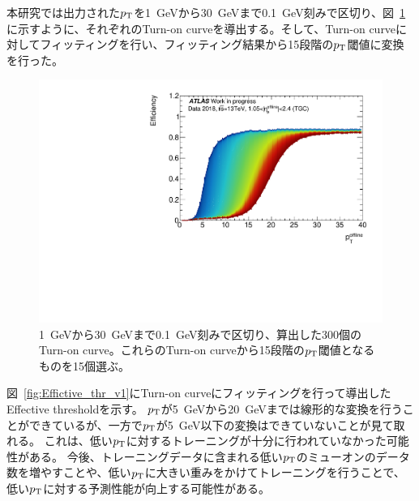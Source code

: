 本研究では出力された$p_{\rm{T}}$を1~GeVから30~GeVまで0.1~GeV刻みで区切り、図~\ref{fig:ALL_Turn-on}に示すように、それぞれのTurn-on curveを導出する。そして、Turn-on curveに対してフィッティングを行い、フィッティング結果から15段階の$p_{\rm{T}}$閾値に変換を行った。
\begin{figure}[htb]
  \centering
  \hspace*{-1cm}
  \includegraphics[clip, width=12cm]{fig/4/ALLthr_v06_Data.pdf}
  \caption{1~GeVから30~GeVまで0.1~GeV刻みで区切り、算出した300個のTurn-on curve。これらのTurn-on curveから15段階の$p_{\rm{T}}$閾値となるものを15個選ぶ。}
  \label{fig:ALL_Turn-on}
\end{figure}
図~\ref{fig:Effictive_thr_v1}にTurn-on curveにフィッティングを行って導出したEffective thresholdを示す。
$p_{\rm{T}}$が5~GeVから20~GeVまでは線形的な変換を行うことができているが、一方で$p_{\rm{T}}$が5~GeV以下の変換はできていないことが見て取れる。
これは、低い$p_{\rm{T}}$に対するトレーニングが十分に行われていなかった可能性がある。
今後、トレーニングデータに含まれる低い$p_{\rm{T}}$のミューオンのデータ数を増やすことや、低い$p_{\rm{T}}$に大きい重みをかけてトレーニングを行うことで、低い$p_{\rm{T}}$に対する予測性能が向上する可能性がある。


